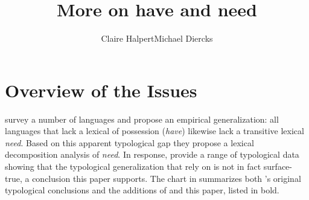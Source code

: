 \documentclass[output=paper,
modfonts
]{langscibook}
\title{More on {have} and {need}}
\author{Claire Halpert\affiliation{University of Minnesota}\lastand Michael Diercks\affiliation{Pomona College}}
\begin{document}
\maketitle
\section{Overview of the Issues} \label{HKoverview}

 \citet{Harves:2012} survey a number of languages and propose an empirical generalization:  all languages that 
lack a lexical  of possession ({\it have}) likewise lack a
transitive lexical  {\it need}. Based on this apparent typological gap they
propose a lexical decomposition analysis of {\it need}. In response, \citet{Antonov:2014} provide a range of typological data showing
that the typological generalization that \citet{Harves:2012} rely on
is not in fact surface-true, a conclusion this paper supports. The chart in
 summarizes both \citet{Harves:2012}'s original typological conclusions and the additions of \citet{Antonov:2014} and this paper, listed in bold. 






\end{document}
